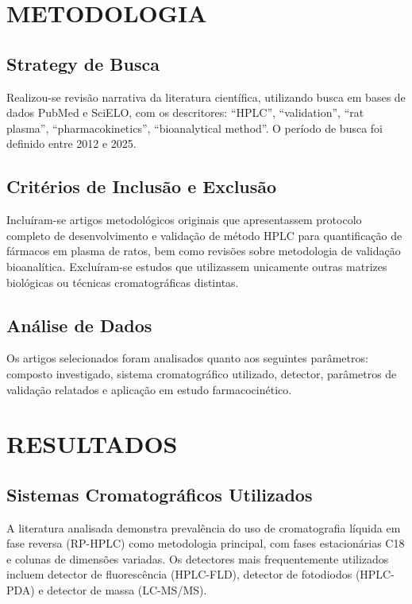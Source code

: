 \section{METODOLOGIA}

\subsection{Strategy de Busca}

Realizou-se revisão narrativa da literatura científica, utilizando busca em bases de dados PubMed e SciELO, com os descritores: ``HPLC'', ``validation'', ``rat plasma'', ``pharmacokinetics'', ``bioanalytical method''. O período de busca foi definido entre 2012 e 2025.

\subsection{Critérios de Inclusão e Exclusão}

Incluíram-se artigos metodológicos originais que apresentassem protocolo completo de desenvolvimento e validação de método HPLC para quantificação de fármacos em plasma de ratos, bem como revisões sobre metodologia de validação bioanalítica. Excluíram-se estudos que utilizassem unicamente outras matrizes biológicas ou técnicas cromatográficas distintas.

\subsection{Análise de Dados}

Os artigos selecionados foram analisados quanto aos seguintes parâmetros: composto investigado, sistema cromatográfico utilizado, detector, parâmetros de validação relatados e aplicação em estudo farmacocinético.

\section{RESULTADOS}

\subsection{Sistemas Cromatográficos Utilizados}

A literatura analisada demonstra prevalência do uso de cromatografia líquida em fase reversa (RP-HPLC) como metodologia principal, com fases estacionárias C18 e colunas de dimensões variadas. Os detectores mais frequentemente utilizados incluem detector de fluorescência (HPLC-FLD), detector de fotodiodos (HPLC-PDA) e detector de massa (LC-MS/MS).

